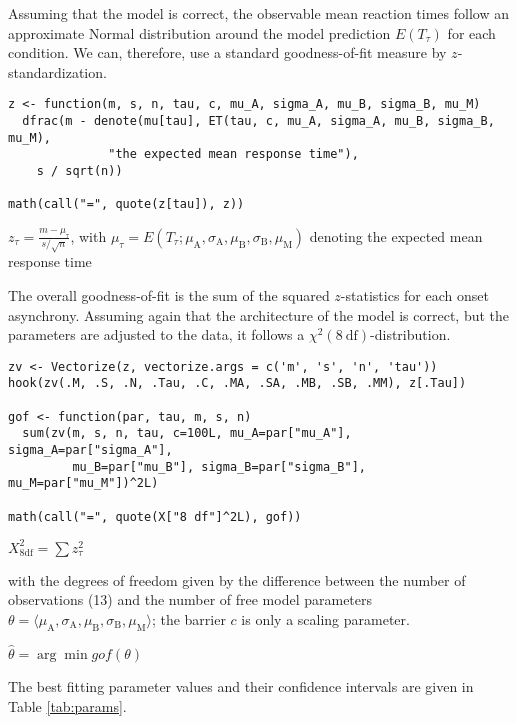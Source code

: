 Assuming that the model is correct, the observable mean reaction times follow an
approximate Normal distribution around the model prediction \(E(T_\tau)\) for
each condition. We can, therefore, use a standard goodness-of-fit measure
by \(z\)-standardization.

\begin{verbatim}
z <- function(m, s, n, tau, c, mu_A, sigma_A, mu_B, sigma_B, mu_M)
  dfrac(m - denote(mu[tau], ET(tau, c, mu_A, sigma_A, mu_B, sigma_B, mu_M),
              "the expected mean response time"),
    s / sqrt(n))

math(call("=", quote(z[tau]), z))
\end{verbatim}

\({{z}_{\tau}}{=}{\displaystyle{\frac{{m}{-}{{\mu}_{\tau}}}{{s}{/}{\sqrt{n}}}}}\), with \({{\mu}_{\tau}}{=}{E{\left({{T}_{\tau}}{;}{{{\mu}_{\mathrm{A}}}{{,}{{\sigma}_{\mathrm{A}}}{{,}{{\mu}_{\mathrm{B}}}{{,}{{\sigma}_{\mathrm{B}}}{{,}{{\mu}_{\mathrm{M}}}}}}}}\right)}}\) denoting the expected mean response time

The overall goodness-of-fit is the sum of the squared \(z\)-statistics for each
onset asynchrony. Assuming again that the architecture of the model is correct,
but the parameters are adjusted to the data, it follows
a \(\chi^2(8\ \mathrm{df})\)-distribution.

\begin{verbatim}
zv <- Vectorize(z, vectorize.args = c('m', 's', 'n', 'tau'))
hook(zv(.M, .S, .N, .Tau, .C, .MA, .SA, .MB, .SB, .MM), z[.Tau])

gof <- function(par, tau, m, s, n)
  sum(zv(m, s, n, tau, c=100L, mu_A=par["mu_A"], sigma_A=par["sigma_A"], 
         mu_B=par["mu_B"], sigma_B=par["sigma_B"], mu_M=par["mu_M"])^2L)

math(call("=", quote(X["8 df"]^2L), gof))
\end{verbatim}

\({{X}_{\mathrm{8 df}}^{2}}{=}{\sum{{z}_{\tau}^{2}}}\)

with the degrees of freedom given by the difference between the number of
observations (13) and the number of free model
parameters \(\theta = \langle\mu_{\mathrm A}, \sigma_{\mathrm A}, \mu_{\mathrm B}, \sigma_{\mathrm B}, \mu_{\mathrm M}\rangle\); the barrier \(c\)
is only a scaling parameter.

\({\hat{\theta}}{=}{\arg\min{gof{\left(\theta\right)}}}\)

The best fitting parameter values and their confidence intervals are given in
Table \ref{tab:params}.

